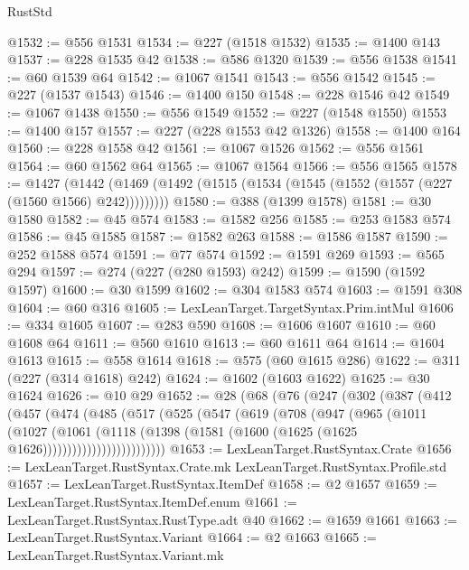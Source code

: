 \begin{lexlean}{RustStd}
\begin{coremodule}
@1532 := @556 @1531
@1534 := @227 (@1518 @1532)
@1535 := @1400 @143
@1537 := @228 @1535 @42
@1538 := @586 @1320
@1539 := @556 @1538
@1541 := @60 @1539 @64
@1542 := @1067 @1541
@1543 := @556 @1542
@1545 := @227 (@1537 @1543)
@1546 := @1400 @150
@1548 := @228 @1546 @42
@1549 := @1067 @1438
@1550 := @556 @1549
@1552 := @227 (@1548 @1550)
@1553 := @1400 @157
@1557 := @227 (@228 @1553 @42 @1326)
@1558 := @1400 @164
@1560 := @228 @1558 @42
@1561 := @1067 @1526
@1562 := @556 @1561
@1564 := @60 @1562 @64
@1565 := @1067 @1564
@1566 := @556 @1565
@1578 := @1427
    (@1442 (@1469 (@1492 (@1515 (@1534 (@1545 (@1552 (@1557 (@227 (@1560 @1566) @242)))))))))
@1580 := @388 (@1399 @1578)
@1581 := @30 @1580
@1582 := @45 @574
@1583 := @1582 @256
@1585 := @253 @1583 @574
@1586 := @45 @1585
@1587 := @1582 @263
@1588 := @1586 @1587
@1590 := @252 @1588 @574
@1591 := @77 @574
@1592 := @1591 @269
@1593 := @565 @294
@1597 := @274 (@227 (@280 @1593) @242)
@1599 := @1590 (@1592 @1597)
@1600 := @30 @1599
@1602 := @304 @1583 @574
@1603 := @1591 @308
@1604 := @60 @316
@1605 := LexLeanTarget.TargetSyntax.Prim.intMul
@1606 := @334 @1605
@1607 := @283 @590
@1608 := @1606 @1607
@1610 := @60 @1608 @64
@1611 := @560 @1610
@1613 := @60 @1611 @64
@1614 := @1604 @1613
@1615 := @558 @1614
@1618 := @575 (@60 @1615 @286)
@1622 := @311 (@227 (@314 @1618) @242)
@1624 := @1602 (@1603 @1622)
@1625 := @30 @1624
@1626 := @10 @29
@1652 := @28
    (@68
      (@76
        (@247
          (@302
            (@387
              (@412
                (@457
                  (@474
                    (@485
                      (@517
                        (@525
                          (@547
                            (@619
                              (@708
                                (@947
                                  (@965
                                    (@1011
                                      (@1027
                                        (@1061
                                          (@1118
                                            (@1398
                                              (@1581
                                                (@1600 (@1625 (@1625 @1626)))))))))))))))))))))))))
@1653 := LexLeanTarget.RustSyntax.Crate
@1656 := LexLeanTarget.RustSyntax.Crate.mk LexLeanTarget.RustSyntax.Profile.std
@1657 := LexLeanTarget.RustSyntax.ItemDef
@1658 := @2 @1657
@1659 := LexLeanTarget.RustSyntax.ItemDef.enum
@1661 := LexLeanTarget.RustSyntax.RustType.adt @40
@1662 := @1659 @1661
@1663 := LexLeanTarget.RustSyntax.Variant
@1664 := @2 @1663
@1665 := LexLeanTarget.RustSyntax.Variant.mk

\end{coremodule}
\end{lexlean}
